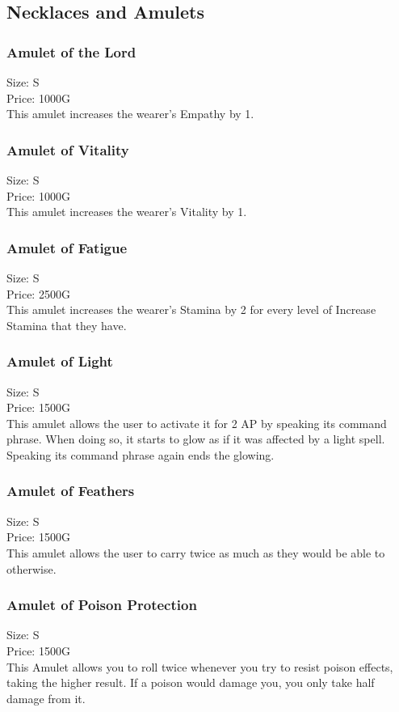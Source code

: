 \subsection{Necklaces and Amulets}

\subsubsection{Amulet of the Lord}
Size: S\\
Price: 1000G\\
This amulet increases the wearer's Empathy by 1.

\subsubsection{Amulet of Vitality}
Size: S\\
Price: 1000G\\
This amulet increases the wearer's Vitality by 1.

\subsubsection{Amulet of Fatigue}
Size: S\\
Price: 2500G\\
This amulet increases the wearer's Stamina by 2 for every level of Increase Stamina that they have.

\subsubsection{Amulet of Light}
Size: S\\
Price: 1500G\\
This amulet allows the user to activate it for 2 AP by speaking its command phrase. When doing so, it starts to glow as if it was affected by a light spell. Speaking its command phrase again ends the glowing.

\subsubsection{Amulet of Feathers}
Size: S\\
Price: 1500G\\
This amulet allows the user to carry twice as much as they would be able to otherwise.

\subsubsection{Amulet of Poison Protection}
Size: S\\
Price: 1500G\\
This Amulet allows you to roll twice whenever you try to resist poison effects, taking the higher result. If a poison would damage you, you only take half damage from it.